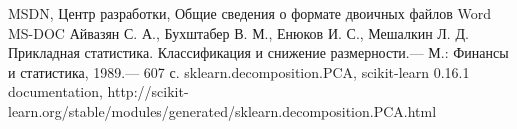 \begin{thebibliography}{99}
 MSDN, Центр разработки, Общие сведения о формате двоичных файлов Word MS-DOC
 Айвазян С. А., Бухштабер В. М., Енюков И. С., Мешалкин Л. Д. Прикладная статистика. Классификация и снижение размерности.— М.: Финансы и статистика, 1989.— 607 с.
 sklearn.decomposition.PCA, scikit-learn 0.16.1 documentation, http://scikit-learn.org/stable/modules/generated/sklearn.decomposition.PCA.html
\end{thebibliography}
